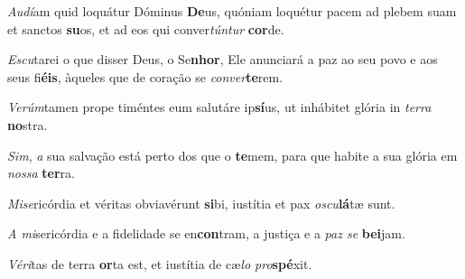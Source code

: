\begin{greenumerate}


  \ifbook%
    \setcounter{enumi}{1}
  \else
    \item \textit{Audí}am quid loquátur Dóminus \textbf{De}us, {\GreDagger} quóniam loquétur pacem ad plebem suam et sanctos \textbf{su}os, {\GreStar} et ad eos qui conver\textit{túntur} \textbf{cor}de. 
  \fi

  \switchcolumn%

  \ifbook%
    \setcounter{enumi}{1}
  \else
    \item \textit{Escu}tarei o que disser Deus, o Se\textbf{nhor}, {\GreDagger} Ele anunciará a paz ao seu povo e aos seus fi\textbf{éis}, {\GreStar} àqueles que de coração se \textit{conver}\textbf{te}rem. 
  \fi

  \switchcolumn*


  \item \textit{Verúm}tamen prope timéntes eum salutáre ip\textbf{sí}us, {\GreStar} ut inhábitet glória in \textit{terra} \textbf{no}stra. 

  \switchcolumn%

  \item \textit{Sim}, \textit{a} sua salvação está perto dos que o \textbf{te}\-mem, {\GreStar} para que habite a sua glória em \textit{nossa} \textbf{ter}ra. 

  \switchcolumn*


  \item \textit{Mise}ricórdia et véritas obviavérunt \textbf{si}bi, {\GreStar} iustítia et pax \textit{oscu}\textbf{lá}tæ sunt. 

  \switchcolumn%

  \item \textit{A mi}sericórdia e a fidelidade se en\textbf{con}tram, {\GreStar} a justiça e a \textit{paz se} \textbf{bei}jam. 

  \switchcolumn*


  \item \textit{Véri}tas de terra \textbf{or}ta est, {\GreStar} et iustítia de cæ\textit{lo pro}\textbf{spé}xit. 


\end{greenumerate}
